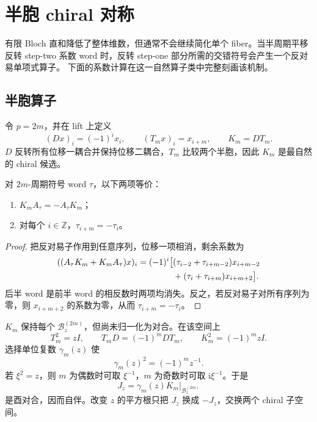 \section{半胞 chiral 对称}
\label{sec:chiral}

有限 Bloch 直和降低了整体维数，但通常不会继续简化单个 fiber。当半周期平移反转
step-two 系数 word 时，反转 step-one 部分所需的交错符号会产生一个反对易单项式算子。
下面的系数计算在这一自然算子类中完整刻画该机制。

\subsection{半胞算子}

令 $p=2m$，并在 lift 上定义
\begin{equation}
 (Dx)_i=(-1)^ix_i,\qquad (T_mx)_i=x_{i+m},\qquad K_m=DT_m.
 \label{eq:half-cell-operators}
\end{equation}
$D$ 反转所有位移一耦合并保持位移二耦合，$T_m$ 比较两个半胞，因此 $K_m$ 是最自然的
chiral 候选。

\begin{theorem}
\label{thm:coefficient-chiral}
对 $2m$-周期符号 word $\tau$，以下两项等价：
\begin{enumerate}
 \item $K_mA_\tau=-A_\tau K_m$；
 \item 对每个 $i\in\mathbb Z$，$\tau_{i+m}=-\tau_i$。
\end{enumerate}
\end{theorem}

\begin{proof}
把反对易子作用到任意序列，位移一项相消，剩余系数为
\begin{align}
 ((A_\tau K_m+K_mA_\tau)x)_i=(-1)^i\bigl[&
 (\tau_{i-2}+\tau_{i+m-2})x_{i+m-2}\notag\\
 &+(\tau_i+\tau_{i+m})x_{i+m+2}\bigr].
 \label{eq:anticommutator-coefficients}
\end{align}
后半 word 是前半 word 的相反数时两项均消失。反之，若反对易子对所有序列为零，则
$x_{i+m+2}$ 的系数为零，从而 $\tau_{i+m}=-\tau_i$。
\end{proof}

$K_m$ 保持每个 $\mathcal B_z^{(2m)}$，但尚未归一化为对合。在该空间上
\begin{equation}
 T_m^2=zI,\qquad T_mD=(-1)^mDT_m,\qquad K_m^2=(-1)^mzI.
 \label{eq:km-square}
\end{equation}
选择单位复数 $\gamma_m(z)$ 使
\begin{equation}
 \gamma_m(z)^2=(-1)^mz^{-1}.
 \label{eq:gamma-normalization}
\end{equation}
若 $\xi^2=z$，则 $m$ 为偶数时可取 $\xi^{-1}$，$m$ 为奇数时可取
$\mathrm i\xi^{-1}$。于是
\begin{equation}
 J_z=\gamma_m(z)K_m|_{\mathcal B_z^{(2m)}}
 \label{eq:normalized-j}
\end{equation}
是酉对合，因而自伴。改变 $z$ 的平方根只把 $J_z$ 换成 $-J_z$，交换两个 chiral 子空间。

